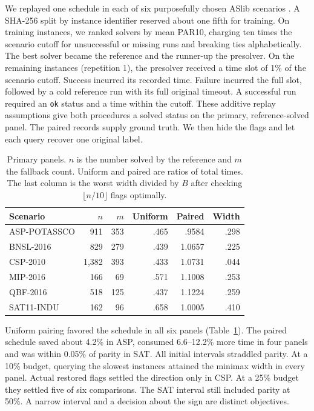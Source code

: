 \documentclass[final,5p,times,twocolumn]{elsarticle}
\begin{document}
We replayed one schedule in each of six purposefully chosen ASlib scenarios \cite{aslib}. A SHA-256 split by instance identifier reserved about one fifth for training. On training instances, we ranked solvers by mean PAR10, charging ten times the scenario cutoff for unsuccessful or missing runs and breaking ties alphabetically. The best solver became the reference and the runner-up the presolver. On the remaining instances (repetition 1), the presolver received a time slot of 1\% of the scenario cutoff. Success incurred its recorded time. Failure incurred the full slot, followed by a cold reference run with its full original timeout. A successful run required an \texttt{ok} status and a time within the cutoff. These additive replay assumptions give both procedures a solved status on the primary, reference-solved panel. The paired records supply ground truth. We then hide the flags and let each query recover one original label.

\begin{table}[t]
\centering\footnotesize
\caption{Primary panels. $n$ is the number solved by the reference and $m$ the fallback count. Uniform and paired are ratios of total times. The last column is the worst width divided by $B$ after checking $\lfloor n/10\rfloor$ flags optimally.}
\label{tab:panels}
\begin{tabular}{lrrrrr}\toprule
Scenario & $n$ & $m$ & Uniform & Paired & Width\\\midrule
ASP-POTASSCO & 911 & 353 & .465 & .9584 & .298\\
BNSL-2016 & 829 & 279 & .439 & 1.0657 & .225\\
CSP-2010 & 1,382 & 393 & .433 & 1.0731 & .044\\
MIP-2016 & 166 & 69 & .571 & 1.1008 & .253\\
QBF-2016 & 518 & 125 & .437 & 1.1224 & .259\\
SAT11-INDU & 162 & 96 & .658 & 1.0005 & .410\\\bottomrule
\end{tabular}
\end{table}

Uniform pairing favored the schedule in all six panels (Table~\ref{tab:panels}). The paired schedule saved about 4.2\% in ASP, consumed 6.6--12.2\% more time in four panels and was within 0.05\% of parity in SAT. All initial intervals straddled parity. At a 10\% budget, querying the slowest instances attained the minimax width in every panel. Actual restored flags settled the direction only in CSP. At a 25\% budget they settled five of six comparisons. The SAT interval still included parity at 50\%. A narrow interval and a decision about the sign are distinct objectives.
\end{document}
